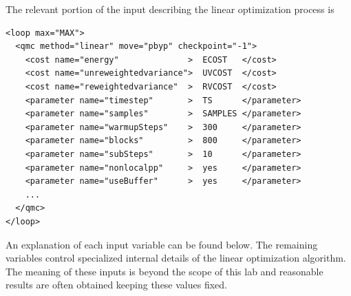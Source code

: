 The relevant portion of the input describing the linear optimization process is
\begin{shaded}
\begin{verbatim}
<loop max="MAX">
  <qmc method="linear" move="pbyp" checkpoint="-1">
    <cost name="energy"              >  ECOST   </cost>
    <cost name="unreweightedvariance">  UVCOST  </cost>
    <cost name="reweightedvariance"  >  RVCOST  </cost>
    <parameter name="timestep"       >  TS      </parameter>
    <parameter name="samples"        >  SAMPLES </parameter>
    <parameter name="warmupSteps"    >  300     </parameter>
    <parameter name="blocks"         >  800     </parameter>
    <parameter name="subSteps"       >  10      </parameter>
    <parameter name="nonlocalpp"     >  yes     </parameter>
    <parameter name="useBuffer"      >  yes     </parameter>
    ...
  </qmc>
</loop>
\end{verbatim}
\end{shaded}
\noindent
An explanation of each input variable can be found below.  The remaining variables control specialized internal details of the linear optimization algorithm.  The meaning of these inputs is beyond the scope of this lab and reasonable results are often obtained keeping these values fixed. 
